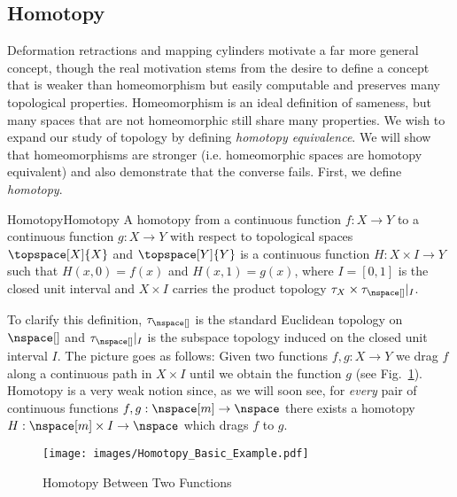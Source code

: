 \documentclass[oneside]{book}                                                  %
\begin{document}
            \subsection{Homotopy}
                Deformation retractions and mapping cylinders motivate a far
                more general concept, though the real motivation stems from the
                desire to define a concept that is weaker than homeomorphism but
                easily computable and preserves many topological properties.
                Homeomorphism is an ideal definition of sameness, but many
                spaces that are not homeomorphic still share many properties. We
                wish to expand our study of topology by defining
                \textit{homotopy equivalence}. We will show that homeomorphisms
                are stronger (i.e. homeomorphic spaces are homotopy equivalent)
                and also demonstrate that the converse fails. First, we define
                \textit{homotopy}.
                \begin{fdefinition}{Homotopy}{Homotopy}
                    A homotopy from a continuous function $f:X\rightarrow{Y}$ to
                    a continuous function $g:X\rightarrow{Y}$ with respect to
                    topological spaces $\topspace[X]{X}$ and $\topspace[Y]{Y}$
                    is a continuous function $H:{X}\times{I}\rightarrow{Y}$ such
                    that $H(x,0)=f(x)$ and $H(x,1)=g(x)$, where $I=[0,1]$ is the
                    closed unit interval and $X\times{I}$ carries the product
                    topology $\tau_{X}\times\tau_{\nspace[]}|_{I}$.
                \end{fdefinition}
                To clarify this definition, $\tau_{\nspace[]}$ is the standard
                Euclidean topology on $\nspace[]$ and $\tau_{\nspace[]}|_{I}$
                is the subspace topology induced on the closed unit interval
                $I$. The picture goes as follows: Given two functions
                $f,g:X\rightarrow{Y}$ we drag $f$ along a continuous path in
                $X\times{I}$ until we obtain the function $g$ (see
                Fig.~\ref{fig:Homotopy_Diagram_for_Depicting_Homotopy}).
                Homotopy is a very weak notion since, as we will soon see, for
                \textit{every} pair of continuous functions
                $f,g:\nspace[m]\rightarrow\nspace$ there exists a homotopy
                $H:\nspace[m]\times{I}\rightarrow\nspace$ which drags $f$ to
                $g$.
                \begin{figure}[H]
                    \centering
                    \captionsetup{type=figure}
                    \texttt{[image: images/Homotopy\_Basic\_Example.pdf]}
                    \caption{Homotopy Between Two Functions}
                    \label{fig:Homotopy_Diagram_for_Depicting_Homotopy}
                \end{figure}
\end{document}
